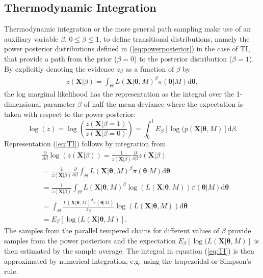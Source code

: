 \documentclass[aps,reprint,amsmath,amssymb,showpacs,showkeys]{revtex4-1}%
\begin{document}
\subsection{Thermodynamic Integration}
Thermodynamic integration or the more general path sampling \citep{Gelman:1998} make use of an auxiliary variable $\beta$, $0\leq \beta \leq 1$, to
define transitional distributions, namely the power posterior distributions defined in (\ref{eq:powerposterior}) in the case of TI, that provide a path from the prior ($\beta=0$) to the posterior distribution ($\beta=1$). By explicitly denoting the evidence $z_\beta$ as a function of $\beta$ by
\begin{align}
z(\bm{X}|\beta)=\int_{\Theta} L(\bm{X}|\bm{\theta},M)^{\beta}\pi(\bm{\theta}|M) \text{d}\bm{\theta},
\end{align}
the log marginal likelihood has the representation as the integral over the 1-dimensional parameter $\beta$ of half the mean deviance where the expectation is taken with respect to the power posterior:
\begin{equation}\label{eq:TI}
\log(z)=\log\left( \frac{z(\bm{X}|\beta=1)}{z(\bm{X}|\beta=0)}\right)=\int_0^1 E_{\beta} \left[ \log(p(\bm{X}|\bm{\theta},M)\right]\text{d}\beta.
\end{equation}
Representation (\ref{eq:TI}) follows by integration from
\begin{align*}
&\frac{\partial}{\partial\beta} \log(z(\bm{X}|\beta)) = \frac{1}{z(\bm{X}|\beta)} \frac{\partial}{\partial\beta} z(\bm{X}|\beta)\\
&= \frac{1}{z(\bm{X}|\beta)} \frac{\partial}{\partial\beta}\int_{\Theta} L(\bm{X}|\bm{\theta},M)^{\beta}\pi(\bm{\theta}|M) \text{d}\bm{\theta}\\
&=  \frac{1}{z(\bm{X}|\beta)} \int_{\Theta}  L(\bm{X}|\bm{\theta},M)^{\beta}\log(L(\bm{X}|\bm{\theta},M)) \pi(\bm{\theta}|M) \text{d}\bm{\theta}\\
&=  \int_{\Theta}   \frac{L(\bm{X}|\bm{\theta},M)^{\beta}\pi(\bm{\theta}|M)}{z_{\beta}} \log(L(\bm{X}|\bm{\theta},M))\text{d}\bm{\theta}\\
&= E_{\beta} \left[ \log(L(\bm{X}|\bm{\theta},M)\right].
\end{align*}
The samples from the parallel tempered chains for different values of $\beta$ provide samples from the power posteriors and the
expectation $E_{\beta}\left[ \log(L(\bm{X}|\bm{\theta},M)\right]$ is then estimated by the sample average. The integral
in equation (\ref{eq:TI}) is then approximated by numerical integration, e.g. using the trapezoidal or Simpson's rule.
\end{document}

